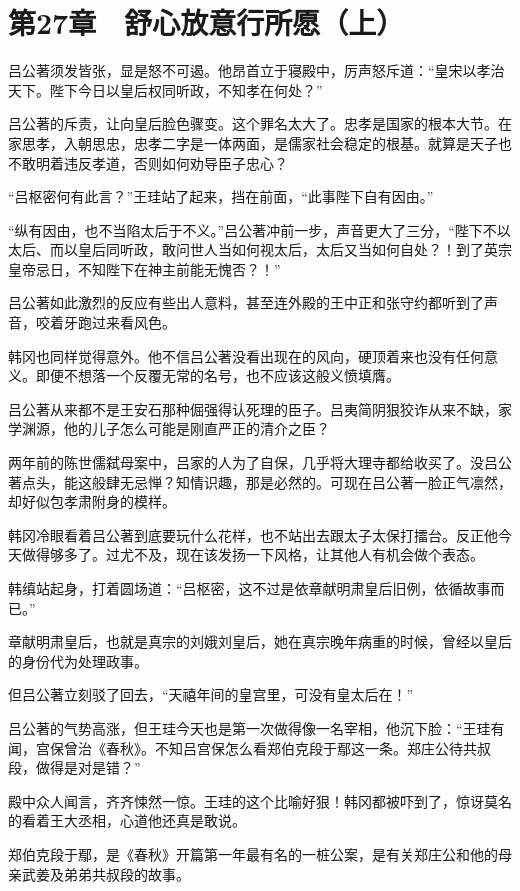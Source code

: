 \section{第27章　舒心放意行所愿（上）}

吕公著须发皆张，显是怒不可遏。他昂首立于寝殿中，厉声怒斥道：“皇宋以孝治天下。陛下今日以皇后权同听政，不知孝在何处？”

吕公著的斥责，让向皇后脸色骤变。这个罪名太大了。忠孝是国家的根本大节。在家思孝，入朝思忠，忠孝二字是一体两面，是儒家社会稳定的根基。就算是天子也不敢明着违反孝道，否则如何劝导臣子忠心？

“吕枢密何有此言？”王珪站了起来，挡在前面，“此事陛下自有因由。”

“纵有因由，也不当陷太后于不义。”吕公著冲前一步，声音更大了三分，“陛下不以太后、而以皇后同听政，敢问世人当如何视太后，太后又当如何自处？！到了英宗皇帝忌日，不知陛下在神主前能无愧否？！”

吕公著如此激烈的反应有些出人意料，甚至连外殿的王中正和张守约都听到了声音，咬着牙跑过来看风色。

韩冈也同样觉得意外。他不信吕公著没看出现在的风向，硬顶着来也没有任何意义。即便不想落一个反覆无常的名号，也不应该这般义愤填膺。

吕公著从来都不是王安石那种倔强得认死理的臣子。吕夷简阴狠狡诈从来不缺，家学渊源，他的儿子怎么可能是刚直严正的清介之臣？

两年前的陈世儒弑母案中，吕家的人为了自保，几乎将大理寺都给收买了。没吕公著点头，能这般肆无忌惮？知情识趣，那是必然的。可现在吕公著一脸正气凛然，却好似包孝肃附身的模样。

韩冈冷眼看着吕公著到底要玩什么花样，也不站出去跟太子太保打擂台。反正他今天做得够多了。过尤不及，现在该发扬一下风格，让其他人有机会做个表态。

韩缜站起身，打着圆场道：“吕枢密，这不过是依章献明肃皇后旧例，依循故事而已。”

章献明肃皇后，也就是真宗的刘娥刘皇后，她在真宗晚年病重的时候，曾经以皇后的身份代为处理政事。

但吕公著立刻驳了回去，“天禧年间的皇宫里，可没有皇太后在！”

吕公著的气势高涨，但王珪今天也是第一次做得像一名宰相，他沉下脸：“王珪有闻，宫保曾治《春秋》。不知吕宫保怎么看郑伯克段于鄢这一条。郑庄公待共叔段，做得是对是错？”

殿中众人闻言，齐齐悚然一惊。王珪的这个比喻好狠！韩冈都被吓到了，惊讶莫名的看着王大丞相，心道他还真是敢说。

郑伯克段于鄢，是《春秋》开篇第一年最有名的一桩公案，是有关郑庄公和他的母亲武姜及弟弟共叔段的故事。

